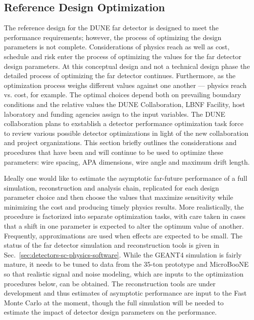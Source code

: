 \subsection{Reference Design Optimization}
\label{sec:detectors-fd-ref-optimization}

The reference design for the DUNE far detector is designed to meet the
performance requirements; however, the process of optimizing the
design parameters is not complete.  Considerations of physics reach as
well as cost, schedule and risk enter the process of optimizing the
values for the far detector design parameters.  At this 
conceptual design and not a technical design phase the detailed process of
optimizing the far detector continues.  Furthermore, as the
optimization process weighs different values against one another ---
physics reach vs. cost, for example. The optimal choices depend both
on prevailing boundary conditions and the relative values the DUNE
Collaboration, LBNF Facility, host laboratory and funding
agencies assign to the input variables. The DUNE collaboration plans
to exstablish a detector performance optimization task force to review
various possible detector optimizations in light of the new
collaboration and project organizations. This section briefly outlines
the considerations and procedures that have been and will continue to
be used to optimize these parameters: wire spacing,
APA dimensions, wire angle and maximum drift length.

Ideally one would like to estimate the asymptotic far-future
performance of a full simulation, reconstruction and analysis chain, replicated 
for each design parameter choice and then choose the values that maximize sensitivity
while minimizing the cost and producing timely physics results.
More realistically, the procedure is factorized into separate optimization tasks, with
care taken in cases that a shift in one parameter is expected to alter the optimum value
of another.  Frequently, approximations are used when effects are expected to be small.
The status of the far detector simulation and reconstruction tools is given in 
Sec.~\ref{sec:detectors-sc-physics-software}.  While the GEANT4 simulation is fairly mature,
it needs to be tuned to data from the 35-ton prototype and MicroBooNE so that realistic
signal and noise modeling, which are inputs to the optimization procedures below, can be obtained.
The reconstruction tools are under development and thus estimates of asymptotic performance
are input to the Fast Monte Carlo at the moment, though the full simulation will be needed
to estimate the impact of detector design parameters on the performance.

